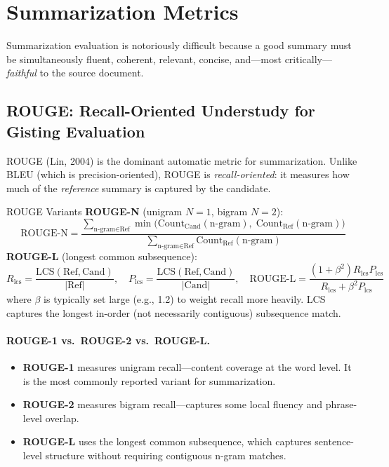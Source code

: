 \section{Summarization Metrics}
\label{sec:summarization_metrics}

Summarization evaluation is notoriously difficult because a good summary must be
simultaneously fluent, coherent, relevant, concise, and---most critically---\emph{faithful} to the source document.

\subsection{ROUGE: Recall-Oriented Understudy for Gisting Evaluation}

ROUGE (Lin, 2004) is the dominant automatic metric for summarization.  Unlike
BLEU (which is precision-oriented), ROUGE is \emph{recall-oriented}: it measures
how much of the \emph{reference} summary is captured by the candidate.

\begin{mathresult}{ROUGE Variants}
\textbf{ROUGE-N} (unigram $N{=}1$, bigram $N{=}2$):
\[
    \text{ROUGE-N} = \frac{\sum_{\text{n-gram} \in \text{Ref}} \min\!\bigl(\text{Count}_{\text{Cand}}(\text{n-gram}),\;\text{Count}_{\text{Ref}}(\text{n-gram})\bigr)}{\sum_{\text{n-gram} \in \text{Ref}} \text{Count}_{\text{Ref}}(\text{n-gram})}
\]
\textbf{ROUGE-L} (longest common subsequence):
\[
    R_{\text{lcs}} = \frac{\text{LCS}(\text{Ref}, \text{Cand})}{|\text{Ref}|}, \quad
    P_{\text{lcs}} = \frac{\text{LCS}(\text{Ref}, \text{Cand})}{|\text{Cand}|}, \quad
    \text{ROUGE-L} = \frac{(1+\beta^2) R_{\text{lcs}} P_{\text{lcs}}}{R_{\text{lcs}} + \beta^2 P_{\text{lcs}}}
\]
where $\beta$ is typically set large (e.g., 1.2) to weight recall more heavily.
LCS captures the longest in-order (not necessarily contiguous) subsequence match.
\end{mathresult}

\paragraph{ROUGE-1 vs.\ ROUGE-2 vs.\ ROUGE-L.}
\begin{itemize}
    \item \textbf{ROUGE-1} measures unigram recall---content coverage at the word
          level.  It is the most commonly reported variant for summarization.
    \item \textbf{ROUGE-2} measures bigram recall---captures some local fluency
          and phrase-level overlap.
    \item \textbf{ROUGE-L} uses the longest common subsequence, which captures
          sentence-level structure without requiring contiguous n-gram matches.
\end{itemize}

